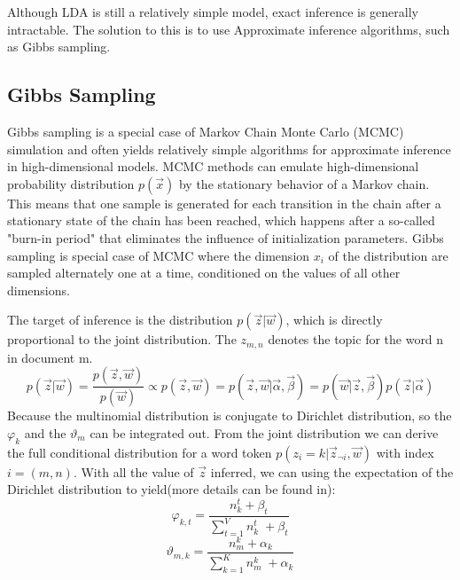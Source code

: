 \documentclass[runningheads,a4paper]{llncs}
\begin{document}
Although LDA is still a relatively simple model, exact inference is generally intractable. The solution to this is to use Approximate inference algorithms, such as Gibbs sampling\cite{griffiths2004finding}.

\subsection{Gibbs Sampling}
\label{gibbs sampling}
Gibbs sampling is a special case of Markov Chain Monte Carlo (MCMC) simulation \cite{mackay2003information} and often yields relatively simple algorithms for approximate inference in high-dimensional models. MCMC methods can emulate high-dimensional probability distribution $p(\vec{x})$ by the stationary behavior of a Markov chain. This means that one sample is generated for each transition in the chain after a stationary state of the chain has been reached, which happens after a so-called "burn-in period" that eliminates the influence of initialization parameters\cite{Walsh:2004}. Gibbs sampling is special case of MCMC where the dimension $x_i$ of the distribution are sampled alternately one at a time, conditioned on the values of all other dimensions.

The target of inference is the distribution $p(\vec{z}|\vec{w})$, which is directly proportional to the joint distribution. The $z_{m,n}$ denotes the topic for the word n in document m.
\begin{equation}
p(\vec{z}|\vec{w})=\frac{p(\vec{z}, \vec{w})}{p(\vec{w})} \propto p(\vec{z}, \vec{w}) = p(\vec{z}, \vec{w}|\vec{\alpha},\vec{\beta}) = p(\vec{w}|\vec{z},\vec{\beta})p(\vec{z}|\vec{\alpha})
\end{equation}
Because the multinomial distribution is conjugate to Dirichlet distribution, so the $\varphi_k$ and the $\vartheta_m$ can be integrated out. From the joint distribution we can derive the full conditional distribution for a word token $p(z_i=k|\vec{z}_{\neg i},\vec{w})$ with index $i=(m,n)$. With all the value of $\vec{z}$ inferred, we can using the expectation of the Dirichlet distribution to yield(more details can be found in\cite{heinrich2005parameter}):
\begin{equation}
\varphi_{k,t}=\frac{n_{k}^{t}+\beta_{t}}{\sum_{t=1}^{V}n_{k}^{t} \; +\beta_{t}}
\end{equation} 
\begin{equation}
\vartheta_{m,k}=\frac{n_{m}^{k}+\alpha_k}{\sum_{k=1}^{K}n_{m}^{k} \; +\alpha_k}
\end{equation} 
\end{document}
